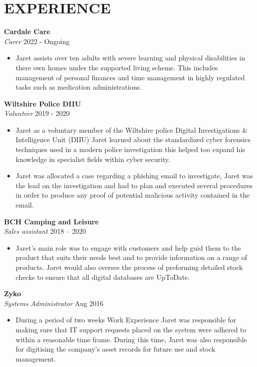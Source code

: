 \section*{EXPERIENCE}

\noindent
\textbf{Cardale Care}\\
\textit{Carer} \hfill 2022 - Ongoing
\begin{itemize}
    \item Jaret assists over ten adults with severe learning and physical disabilities in there own homes under the supported living scheme. This includes management of personal finances and time management in highly regulated tasks such as medication administrations.
\end{itemize}

\noindent
\textbf{Wiltshire Police DIIU}\\
\textit{Volunteer} \hfill 2019 - 2020 
\begin{itemize}
    \item Jaret as a voluntary member of the Wiltshire police Digital Investigations \& Intelligence Unit (DIIU) Jaret learned about the standardized cyber forensics techniques used in a modern police investigation this helped too expand his knowledge in specialist fields within cyber security.
    \item Jaret was allocated a case regarding a phishing email to investigate, Jaret was the lead on the investigation and had to plan and executed several procedures in order to produce any proof of potential malicious activity contained in the email.
\end{itemize}

\noindent
\textbf{BCH Camping and Leisure}\\
\textit{Sales assistant} \hfill 2018 – 2020
\begin{itemize}
    \item Jaret’s main role was to engage with customers and help guid them to the product that suits their needs best and to provide information on a range of products. Jaret would also oversee the process of preforming detailed stock checks to ensure that all digital databases are UpToDate. 
\end{itemize}

\noindent
\textbf{Zyko}\\
\textit{Systems Administrator} \hfill Aug 2016
\begin{itemize}
    \item During a period of two weeks Work Experience Jaret was responsible for making sure that IT support requests placed on the system were adhered to within a reasonable time frame. During this time, Jaret was also responsible for digitising the company’s asset records for future use and stock management.
\end{itemize}


